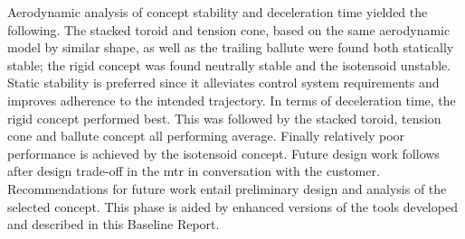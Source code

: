 \newline
\newline
Aerodynamic analysis of concept stability and deceleration time yielded the following. The stacked toroid and tension cone, based on the same aerodynamic model by similar shape, as well as the trailing ballute were found both statically stable; the rigid concept was found neutrally stable and the isotensoid unstable. Static stability is preferred since it alleviates control system requirements and improves adherence to the intended trajectory. In terms of deceleration time, the rigid concept performed best. This was followed by the stacked toroid, tension cone and ballute concept all performing average. Finally relatively poor performance is achieved by the isotensoid concept.
\newline
\newline
Future design work follows after design trade-off in the \acrfull{mtr} in conversation with the customer. Recommendations for future work entail preliminary design and analysis of the selected concept. This phase is aided by enhanced versions of the tools developed and described in this Baseline Report. 



